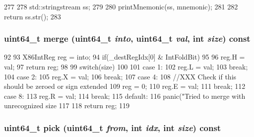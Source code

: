 \begin{DoxyCode}
277     {
278         std::stringstream ss;
279 
280         printMnemonic(ss, mnemonic);
281 
282         return ss.str();
283     }
\end{DoxyCode}
\hypertarget{classX86ISA_1_1X86StaticInst_a8063d634cde6ed5d0467b01364cb6df3}{
\subsubsection[{merge}]{\setlength{\rightskip}{0pt plus 5cm}uint64\_\-t merge (uint64\_\-t {\em into}, \/  uint64\_\-t {\em val}, \/  int {\em size}) const}}
\label{classX86ISA_1_1X86StaticInst_a8063d634cde6ed5d0467b01364cb6df3}



\begin{DoxyCode}
92         {
93             X86IntReg reg = into;
94             if(_destRegIdx[0] & IntFoldBit)
95             {
96                 reg.H = val;
97                 return reg;
98             }
99             switch(size)
100             {
101               case 1:
102                 reg.L = val;
103                 break;
104               case 2:
105                 reg.X = val;
106                 break;
107               case 4:
108                 //XXX Check if this should be zeroed or sign extended
109                 reg = 0;
110                 reg.E = val;
111                 break;
112               case 8:
113                 reg.R = val;
114                 break;
115               default:
116                 panic("Tried to merge with unrecognized size %
117             }
118             return reg;
119         }
\end{DoxyCode}
\hypertarget{classX86ISA_1_1X86StaticInst_a738817873fb5a0a17a835ab025905a25}{
\subsubsection[{pick}]{\setlength{\rightskip}{0pt plus 5cm}uint64\_\-t pick (uint64\_\-t {\em from}, \/  int {\em idx}, \/  int {\em size}) const}}
\label{classX86ISA_1_1X86StaticInst_a738817873fb5a0a17a835ab025905a25}




